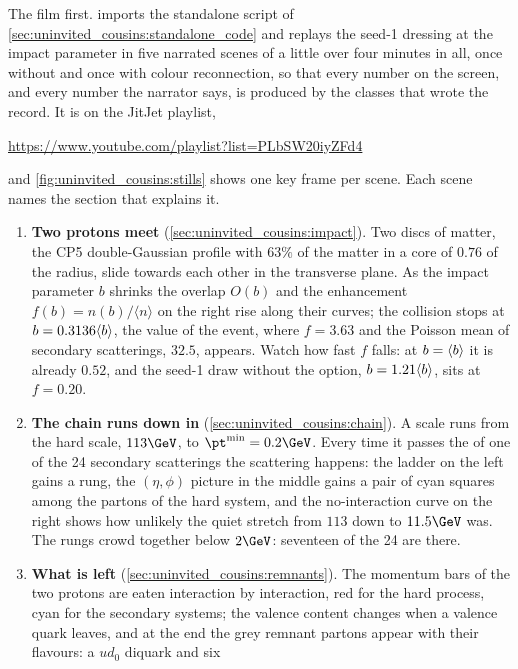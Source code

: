 The film first. 
imports the standalone script of \cref{sec:uninvited_cousins:standalone_code}
and replays the seed-1 dressing at the \CMSSW impact parameter in five
narrated scenes of a little over four minutes in all, once without and
once with colour reconnection, so that every number on the screen, and every
number the narrator says, is produced by the classes that wrote the record.
It is on the JitJet playlist,
\begin{center}
  \url{https://www.youtube.com/playlist?list=PLbSW20iyZFd4}
\end{center}
and \cref{fig:uninvited_cousins:stills} shows one key frame per scene. Each
scene names the section that explains it.
\begin{enumerate}
  \item \textbf{Two protons meet} (\cref{sec:uninvited_cousins:impact}).
    Two discs of matter, the CP5 double-Gaussian profile with $63\%$ of the
    matter in a core of $0.76$ of the radius, slide towards each other in
    the transverse plane. As the impact parameter $b$ shrinks the overlap
    $O(b)$ and the enhancement $f(b)=n(b)/\langle n\rangle$ on the right
    rise along their curves; the collision stops at $b=0.3136\langle b\rangle$, the
    value of the \CMSSW event, where $f=3.63$ and the Poisson mean of
    secondary scatterings, $32.5$, appears. Watch how fast $f$ falls: at
    $b=\langle b\rangle$ it is already $0.52$, and the seed-1 draw without the
     option, $b=1.21\langle b\rangle$, sits at $f=0.20$.
  \item \textbf{The chain runs down in \pt} (\cref{sec:uninvited_cousins:chain}).
    A scale runs from the hard scale, $113\GeV$, to $\pt^{\min}=0.2\GeV$.
    Every time it passes the \pt of one of the 24 secondary scatterings the
    scattering happens: the ladder on the left gains a rung, the
    $(\eta,\phi)$ picture in the middle gains a pair of cyan squares among
    the partons of the hard system, and the no-interaction curve on the
    right shows how unlikely the quiet stretch from $113$ down to
    $11.5\GeV$ was. The rungs crowd together below $2\GeV$: seventeen of
    the 24 are there.
  \item \textbf{What is left} (\cref{sec:uninvited_cousins:remnants}). The
    momentum bars of the two protons are eaten interaction by interaction,
    red for the hard process, cyan for the secondary systems; the valence
    content changes when a valence quark leaves, and at the end the grey
    remnant partons appear with their flavours: a $ud_0$ diquark and six

\end{enumerate}
